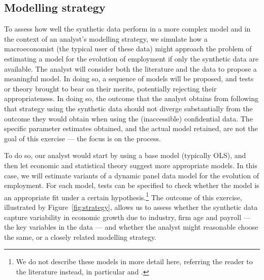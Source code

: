 \documentclass[10pt]{article}
\begin{document}
\subsection{Modelling strategy}

To assess how well the synthetic data perform in a more complex model and in the context of an analyst's modelling strategy, we simulate how a macroeconomist (the typical user of these data) might approach the problem of estimating a model for the evolution of employment if only the synthetic data are available. The analyst will consider both the literature and the data to propose a meaningful model. In doing so, a sequence of models will be proposed, and tests or theory brought to bear on their merits, potentially rejecting their appropriateness. In doing so, the outcome that the analyst obtains from following that strategy using the synthetic data should not diverge substantially from the outcome they would obtain when using the (inaccessible) confidential data. The specific parameter estimates obtained, and the actual model retained, are not the goal of this exercise --- the focus is on the process.

To do so, our analyst would start by using a base model (typically OLS), and then let economic and statistical theory suggest more appropriate models. In this case, we will estimate variants of a dynamic panel data model for the evolution of employment. For each model, tests can be specified to check whether the model is an appropriate fit under a certain hypothesis.\footnote{We do not describe these models in more detail here, referring the reader to the literature instead, in particular \textcite{RePEc:eee:econom:v:68:y:1995:i:1:p:29-51} and \textcite{RePEc:eee:econom:v:87:y:1998:i:1:p:115-143}.} The outcome of this exercise, illustrated by Figure~\ref{fig:strategy}, allows us to assess whether the synthetic data capture variability in economic growth due to industry, firm age and payroll --- the key variables in the data --- and whether the analyst might reasonable choose the same, or a closely related modelling strategy.
\end{document}
